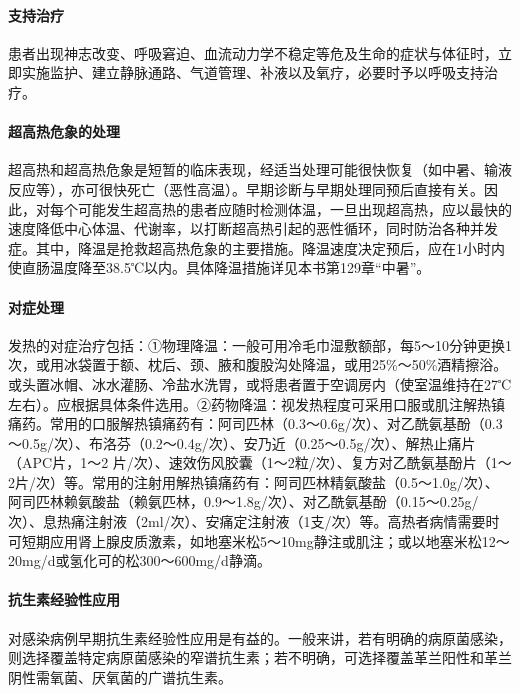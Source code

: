 \paragraph{支持治疗}

患者出现神志改变、呼吸窘迫、血流动力学不稳定等危及生命的症状与体征时，立即实施监护、建立静脉通路、气道管理、补液以及氧疗，必要时予以呼吸支持治疗。

\paragraph{超高热危象的处理}

超高热和超高热危象是短暂的临床表现，经适当处理可能很快恢复（如中暑、输液反应等），亦可很快死亡（恶性高温）。早期诊断与早期处理同预后直接有关。因此，对每个可能发生超高热的患者应随时检测体温，一旦出现超高热，应以最快的速度降低中心体温、代谢率，以打断超高热引起的恶性循环，同时防治各种并发症。其中，降温是抢救超高热危象的主要措施。降温速度决定预后，应在1小时内使直肠温度降至38.5℃以内。具体降温措施详见本书第129章“中暑”。

\paragraph{对症处理}

发热的对症治疗包括：①物理降温：一般可用冷毛巾湿敷额部，每5～10分钟更换1次，或用冰袋置于额、枕后、颈、腋和腹股沟处降温，或用25\%～50\%酒精擦浴。或头置冰帽、冰水灌肠、冷盐水洗胃，或将患者置于空调房内（使室温维持在27℃左右）。应根据具体条件选用。②药物降温：视发热程度可采用口服或肌注解热镇痛药。常用的口服解热镇痛药有：阿司匹林（0.3～0.6g/次）、对乙酰氨基酚（0.3～0.5g/次）、布洛芬（0.2～0.4g/次）、安乃近（0.25～0.5g/次）、解热止痛片（APC片，1～2
片/次）、速效伤风胶囊（1～2粒/次）、复方对乙酰氨基酚片（1～2片/次）等。常用的注射用解热镇痛药有：阿司匹林精氨酸盐（0.5～1.0g/次）、阿司匹林赖氨酸盐（赖氨匹林，0.9～1.8g/次）、对乙酰氨基酚（0.15～0.25g/次）、息热痛注射液（2ml/次）、安痛定注射液（1支/次）等。高热者病情需要时可短期应用肾上腺皮质激素，如地塞米松5～10mg静注或肌注；或以地塞米松12～20mg/d或氢化可的松300～600mg/d静滴。

\paragraph{抗生素经验性应用}

对感染病例早期抗生素经验性应用是有益的。一般来讲，若有明确的病原菌感染，则选择覆盖特定病原菌感染的窄谱抗生素；若不明确，可选择覆盖革兰阳性和革兰阴性需氧菌、厌氧菌的广谱抗生素。

